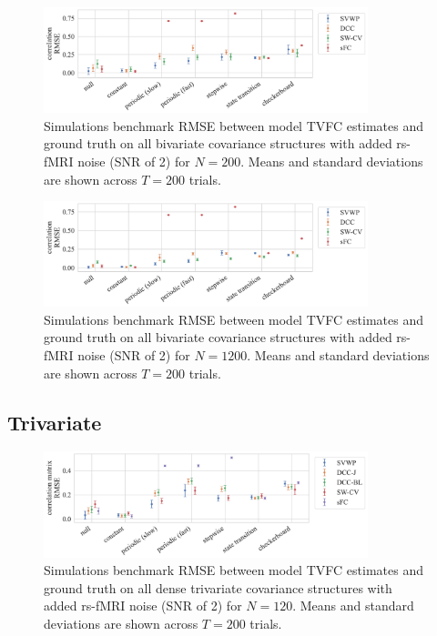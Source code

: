 \begin{figure}[ht]
  \centering
  \includegraphics[width=0.84\textwidth]{fig/sim/d2/N0200_T0200/no_noise/correlation_RMSE}
  \caption{
    Simulations benchmark RMSE between model TVFC estimates and ground truth on all bivariate covariance structures with added rs-fMRI noise (SNR of 2) for $N = 200$.
    Means and standard deviations are shown across $T = 200$ trials.
  }\label{fig:results-sim-d2-200-no-noise-all-correlation-RMSE}
\end{figure}


\begin{figure}[ht]
  \centering
  \includegraphics[width=0.84\textwidth]{fig/sim/d2/N1200_T0200/no_noise/correlation_RMSE}
  \caption{
    Simulations benchmark RMSE between model TVFC estimates and ground truth on all bivariate covariance structures with added rs-fMRI noise (SNR of 2) for $N = 1200$.
    Means and standard deviations are shown across $T = 200$ trials.
  }\label{fig:results-sim-d2-1200-no-noise-all-correlation-RMSE}
\end{figure}


\clearpage
\subsection{Trivariate}


\begin{figure}[ht]
  \centering
  \includegraphics[width=0.84\textwidth]{fig/sim/d3d/N0120_T0200/no_noise/correlation_matrix_RMSE}
  \caption{
    Simulations benchmark RMSE between model TVFC estimates and ground truth on all dense trivariate covariance structures with added rs-fMRI noise (SNR of 2) for $N = 120$.
    Means and standard deviations are shown across $T = 200$ trials.
  }\label{fig:results-sim-d3d-120-no-noise-all-correlation-matrix-RMSE}
\end{figure}



